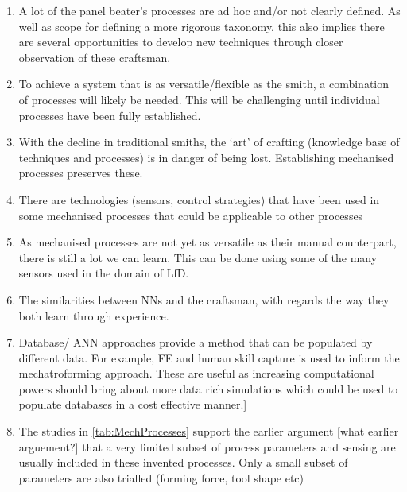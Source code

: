\begin{enumerate}

\item A lot of the panel beater's processes are ad hoc and/or not clearly defined. As well as scope for defining a more rigorous taxonomy, this also implies there are several opportunities to develop new techniques through closer observation of these craftsman.
\item To achieve a system that is as versatile/flexible as the smith, a combination of processes will likely be needed. This will be challenging until individual processes have been fully established.
\item With the decline in traditional smiths, the `art' of crafting (knowledge base of techniques and processes) is in danger of being lost. Establishing mechanised processes preserves these.
\item There are technologies (sensors, control strategies) that have been used in some mechanised processes that could be applicable to other processes
\item As mechanised processes are not yet as versatile as their manual counterpart, there is still a lot we can learn. This can be done using some of the many sensors used in the domain of LfD.
\item The similarities between NNs and the craftsman, with regards the way they both learn through experience. 
\item Database/ ANN approaches provide a method that can be populated by different data. For example, FE and human skill capture is used to inform the mechatroforming approach. These are useful as increasing computational powers should bring about more data rich simulations which could be used to populate databases in a cost effective manner.]
\item The studies in \ref{tab:MechProcesses} support the earlier argument [what earlier arguement?] that a very limited subset of process parameters and sensing are usually included in these invented processes. Only a small subset of parameters are also trialled (forming force, tool shape etc)

\end{enumerate}





\renewcommand{\bibname}{References}
\clearpage
%

%


